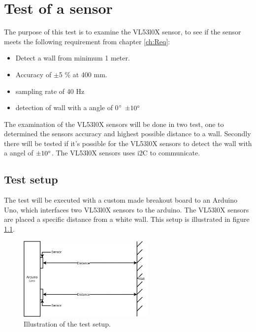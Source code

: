 \chapter{Test of a sensor}\label{ap:testOfSensors}

%
The purpose of this test is to examine the VL53l0X sensor, to see if the sensor meets the following requirement from chapter \ref{ch:Req}:
\begin{itemize}
    \item Detect a wall from minimum 1 meter.
    \item Accuracy of $\pm$5 \% at 400 mm.
    \item sampling rate of 40 Hz
    \item detection of wall with a angle of 0$\degree$ $\pm 10 \degree$
\end{itemize}
The examination of the VL53l0X sensors will be done in two test, one to determined the sensors accuracy and highest possible distance to a wall. Secondly there will be tested if it's possible for the VL53l0X sensors to detect the wall with a angel of $\pm 10 \degree$.
The VL53l0X sensors uses i2C to communicate.

%
\section*{Test setup}
The test will be executed with a custom made breakout board to an Arduino Uno, which interfaces two VL53l0X sensors to the arduino. The VL53l0X sensors are placed a specific distance from a white wall. This setup is illustrated in figure \ref{fig:testSetupSensor}.
\begin{figure}[H]
    \centering
    \includegraphics[width=0.6\textwidth]{figures/Appendix/testopstillingSensor.png}
    \caption{Illustration of the test setup.}
    \label{fig:testSetupSensor}
\end{figure}

